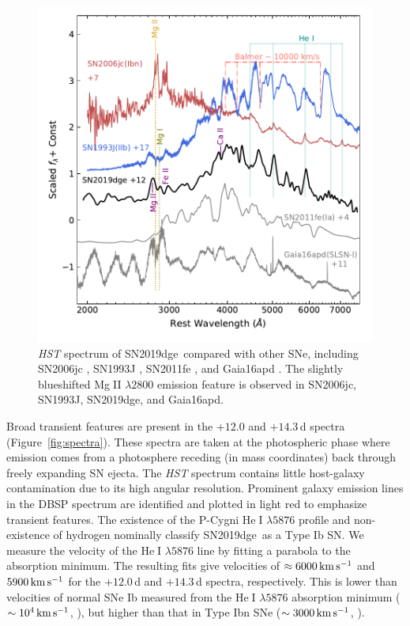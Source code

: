 \documentclass[twocolumn]{aastex63}
\newcommand{\name}{SN2019dge}
\def\ion#1#2{#1$\;${\footnotesize\rm{#2}}\relax}
\begin{document}
\begin{figure}[htbp!]
	\centering
	\includegraphics[width=\columnwidth]{figures/hst_all.pdf}
	\caption{\textit{HST} spectrum of \name\ compared with other SNe, including SN2006jc 
		\citep{Bufano2009}, SN1993J \citep{Jeffery1994}, SN2011fe \citep{Mazzali2014}, and Gaia16apd 
		\citep{Yan2017}. The slightly blueshifted \ion{Mg}{II} $\lambda 2800$ emission feature is observed 
		in SN2006jc, SN1993J, SN2019dge, and Gaia16apd.
		\label{fig:hst}}
\end{figure}

Broad transient features are present in the $+12.0$ and $+14.3$\,d spectra (Figure~\ref{fig:spectra}). 
These spectra are taken at the photospheric phase where emission comes from a photosphere 
receding (in mass coordinates) back through freely expanding SN ejecta. 
The \textit{HST} spectrum contains little host-galaxy contamination 
due to its high angular resolution. Prominent galaxy emission lines in the DBSP 
spectrum are identified and plotted in light red to emphasize transient features. The existence of the
P-Cygni \ion{He}{I} $\lambda5876$ profile and non-existence of hydrogen nominally classify \name\ as 
a Type Ib SN. We measure the velocity of the \ion{He}{I} $\lambda5876$ line by fitting a parabola to the 
absorption minimum. The resulting fits give velocities of $\approx 6000\, {\rm km\,s^{-1}}$ and $ 5900\, 
{\rm km\,s^{-1}}$ for the $+12.0$\,d and $+14.3$\,d spectra, respectively. This is lower than velocities 
of normal SNe Ib measured from the \ion{He}{I} $\lambda5876$ absorption minimum ($\sim 10^4\, \rm 
km\, s^{-1}$, \citealt{Liu2016}), but higher than that in Type Ibn SNe ($\sim 3000\, \rm km\, s^{-1}$, 
\citealt{Hosseinzadeh2017}). 
\end{document}
